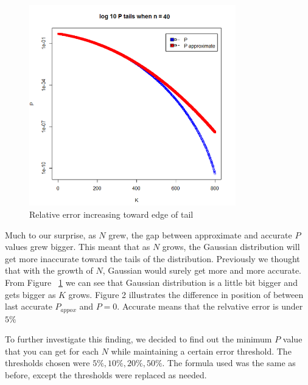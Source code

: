\documentclass[12pt]{article}
\begin{document}
\begin{figure}[!h]
	\centering
  \includegraphics[width=0.8\textwidth]{log10PtailsN40}
	\caption{Relative error increasing toward edge of tail}
	\label{fig:log10PtailsN40}
\end{figure}

Much to our surprise, as $N$ grew, the gap between approximate and accurate $P$ values grew bigger. This meant that as $N$ grows, the Gaussian distribution will get more inaccurate toward the tails of the distribution. Previously we thought that with the growth of $N$, Gaussian would surely get more and more accurate.
From Figure ~\ref{fig:log10PtailsN40} we can see that Gaussian distribution is a little bit bigger and gets bigger as $K$ grows. Figure 2 illustrates the difference in position of between last accurate $P_{appox}$ and $P = 0$. Accurate means that the relvative error is under $5\%$

To further investigate this finding, we decided to find out the minimum $P$ value that you can get for each $N$ while maintaining a certain error threshold. The thresholds chosen were $5\%, 10\%, 20\%, 50\%$. The formula used was the same as before, except the thresholds were replaced as needed.
\end{document}
